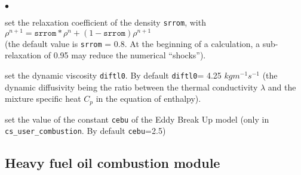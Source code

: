 \begin{list}{$\bullet$}{}

 \item set the relaxation coefficient of the density \texttt{srrom}, with \\
$\rho^{n+1}=\texttt{srrom}*\rho^{n}+(1-\texttt{srrom})\rho^{n+1}$\\
(the default value is \texttt{srrom} = 0.8. At the
      beginning of a calculation, a sub-relaxation of 0.95 may reduce
      the numerical ``shocks'').

 \item set the dynamic viscosity \texttt{diftl0}. By default
      \texttt{diftl0}= 4.25 $kgm^{-1}s^{-1}$
(the dynamic diffusivity being the ratio between the thermal
      conductivity $\lambda$ and the mixture specific heat $C_p$ in the
      equation of enthalpy).

 \item set the value of the constant \texttt{cebu} of the Eddy Break
      Up model (only in \texttt{cs\_user\_combustion}. By default \texttt{cebu}=2.5)
\end{list}

\subsection{Heavy fuel oil combustion module}
